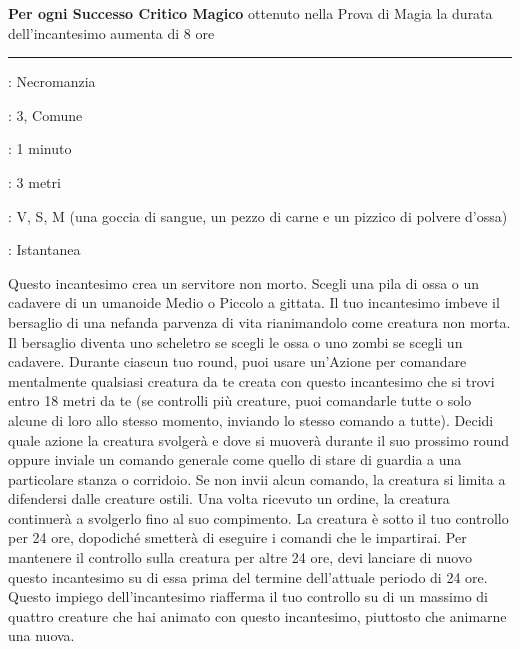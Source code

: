 \begin{multicols}{2}
\textbf{Per ogni Successo Critico Magico} ottenuto nella Prova di Magia la durata dell'incantesimo aumenta di 8 ore

\smallskip\noindent\rule{\linewidth}{2pt} \hypertarget{Animare Morti}{}\smallskip{}
\noindent
\begin{description}[noitemsep, topsep=0pt, parsep=0pt, partopsep=0pt, leftmargin=0cm, labelwidth=2.8cm]
\item[\textbf{Lista di Magia}]: Necromanzia
\item[\textbf{Livello}]: 3, Comune
\item[\textbf{T. di Lancio}]: 1 minuto
\item[\textbf{Gittata}]: 3 metri
\item[\textbf{Componenti}]: V, S, M (una goccia di sangue, un pezzo di carne e un pizzico di polvere d'ossa)
\item[\textbf{Durata}]: Istantanea
\end{description}

Questo incantesimo crea un servitore non morto. Scegli una pila di ossa o un cadavere di un umanoide Medio o Piccolo a gittata. Il tuo incantesimo imbeve il bersaglio di una nefanda parvenza di vita rianimandolo come creatura non morta. Il bersaglio diventa uno scheletro se scegli le ossa o uno zombi se scegli un cadavere. Durante ciascun tuo round, puoi usare un'Azione per comandare mentalmente qualsiasi creatura da te creata con questo incantesimo che si trovi entro 18 metri da te (se controlli più creature, puoi comandarle tutte o solo alcune di loro allo stesso momento, inviando lo stesso comando a tutte). Decidi quale azione la creatura svolgerà e dove si muoverà durante il suo prossimo round oppure inviale un comando generale come quello di stare di guardia a una particolare stanza o corridoio. Se non invii alcun comando, la creatura si limita a difendersi dalle creature ostili. Una volta ricevuto un ordine, la creatura continuerà a svolgerlo fino al suo compimento. La creatura è sotto il tuo controllo per 24 ore, dopodiché smetterà di eseguire i comandi che le impartirai. Per mantenere il controllo sulla creatura per altre 24 ore, devi lanciare di nuovo questo incantesimo su di essa prima del termine dell'attuale periodo di 24 ore. Questo impiego dell'incantesimo riafferma il tuo controllo su di un massimo di quattro creature che hai animato con questo incantesimo, piuttosto che animarne una nuova.


\end{multicols}
